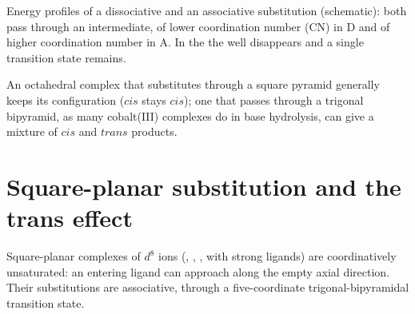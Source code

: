 \begin{omfigure}

{\small Energy profiles of a dissociative and an associative substitution
(schematic): both pass through an intermediate, of lower coordination number
(CN) in D and of higher coordination number in A. In the 
the well disappears and a single transition state remains.}
\end{omfigure}

An octahedral complex that substitutes through a square pyramid generally
keeps its configuration ($cis$ stays $cis$); one that passes through a trigonal
bipyramid, as many cobalt(III) complexes do in base hydrolysis, can give a
mixture of $cis$ and $trans$ products.

\section{Square-planar substitution and the trans effect}

Square-planar complexes of $d^8$ ions (, , ,  with strong ligands)
are coordinatively unsaturated: an entering ligand can approach along the
empty axial direction. Their substitutions are associative, through a
five-coordinate trigonal-bipyramidal transition state.

